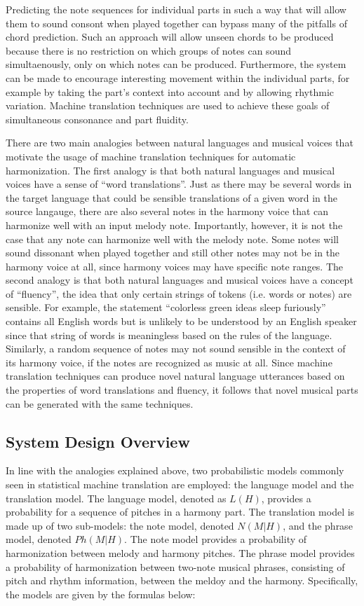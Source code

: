 \documentclass{sig-alternate}
\begin{document}
Predicting the note sequences for individual parts in such a way that will allow them to sound consont when played together can bypass many of the pitfalls of chord prediction. 
Such an approach will allow unseen chords to be produced because there is no restriction on which groups of notes can sound simultaenously, only on which notes can be produced. Furthermore, the system can be made to encourage interesting movement within the individual parts, for example by taking the part's context into account and by allowing rhythmic variation. Machine translation techniques are used to achieve these goals of simultaneous consonance and part fluidity.

There are two main analogies between natural languages and musical voices that motivate the usage of machine translation techniques for automatic harmonization. The first analogy is that both natural languages and musical voices have a sense of ``word translations''. Just as there may be several words in the target language that could be sensible translations of a given word in the source 
langauge, there are also several notes in the harmony voice that can harmonize well with an input melody note. Importantly, however, it is not the case that any note can harmonize well with the melody note. Some notes will sound dissonant when played together and still other notes may not be in the harmony voice at all, since harmony voices may have specific note ranges. The second analogy is that both natural languages and musical voices have a concept of ``fluency'', the idea that only certain strings of tokens (i.e. words or notes) are sensible. For example, the statement ``colorless green ideas sleep furiously'' contains all English words but is unlikely to be understood by an English speaker since that string of words is meaningless based on the rules of the language. Similarly, a random sequence of notes may not sound sensible in the context of its harmony voice, if the notes are recognized as music at all. Since machine translation techniques can produce novel natural language utterances based on the properties of word translations and fluency, it follows that novel musical parts can be generated with the same techniques.

\subsection{System Design Overview}

In line with the analogies explained above, two probabilistic models commonly seen in statistical machine translation are employed: the language model and the translation model. The language model, denoted as $L(H)$, provides a probability for a sequence of pitches in a harmony part. The translation model is made up of two sub-models: the note model, denoted $N(M|H)$, and the phrase model, denoted $Ph(M|H)$. The note model provides a probability of harmonization between melody and harmony pitches. The phrase model provides a probability of harmonization between two-note musical phrases, consisting of pitch and rhythm information, between the meldoy and the harmony. Specifically, the models are given by the formulas below: 
\\
\end{document}
